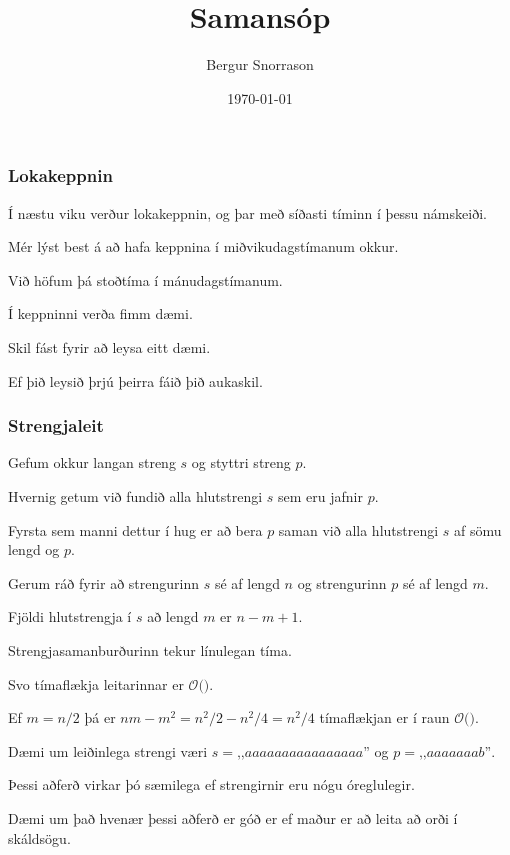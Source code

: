 \title{Samansóp}
\author{Bergur Snorrason}
\date{\today}



\frame{\titlepage}

{
	\frametitle{Lokakeppnin}
	{
		\item<1-> Í næstu viku verður lokakeppnin, og þar með síðasti tíminn í þessu námskeiði.
		\item<2-> Mér lýst best á að hafa keppnina í miðvikudagstímanum okkur.
		\item<3-> Við höfum þá stoðtíma í mánudagstímanum.
		\item<4-> Í keppninni verða fimm dæmi.
		\item<5-> Skil fást fyrir að leysa eitt dæmi.
		\item<6-> Ef þið leysið þrjú þeirra fáið þið aukaskil.
	}
}

{
}

{
	\frametitle{Strengjaleit}
	{
		\item<1-> Gefum okkur langan streng $s$ og styttri streng $p$.
		\item<2-> Hvernig getum við fundið alla hlutstrengi $s$ sem eru jafnir $p$.
		\item<3-> Fyrsta sem manni dettur í hug er að bera $p$ saman við alla hlutstrengi $s$ af sömu lengd og $p$.
	}
}

{
}

{
	{
		\item<1-> Gerum ráð fyrir að strengurinn $s$ sé af lengd $n$ og strengurinn $p$ sé af lengd $m$.
		\item<2-> Fjöldi hlutstrengja í $s$ að lengd $m$ er $n - m + 1$.
		\item<3-> Strengjasamanburðurinn tekur línulegan tíma.
		\item<4-> Svo tímaflækja leitarinnar er $\mathcal{O}($\onslide<5->{$nm - m^2$}$)$.
		\item<6-> Ef $m = n/2$ þá er $nm - m^2 = n^2/2 - n^2/4 = n^2/4$ tímaflækjan er í raun $\mathcal{O}($\onslide<7->{$n^2$}$)$.
		\item<8-> Dæmi um leiðinlega strengi væri $s = \text{,,}aaaaaaaaaaaaaaaa\text{''}$ og $p = \text{,,}aaaaaaab\text{''}$.
		\item<9-> Þessi aðferð virkar þó sæmilega ef strengirnir eru nógu óreglulegir.
		\item<10-> Dæmi um það hvenær þessi aðferð er góð er ef maður er að leita að orði í skáldsögu.
	}
}

